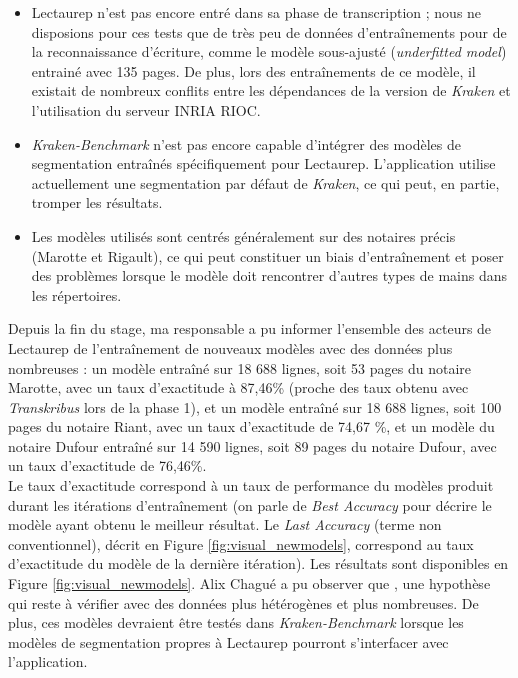 \begin{itemize}
    \item Lectaurep n'est pas encore entré dans sa phase de transcription ; nous ne disposions pour ces tests que de très peu de données d'entraînements pour de la reconnaissance d'écriture, comme le modèle sous-ajusté (\textit{underfitted model})  entrainé avec 135 pages. De plus, lors des entraînements de ce modèle, il existait de nombreux conflits entre les dépendances de la version de \textit{Kraken} et l'utilisation du serveur INRIA RIOC.
    \item \textit{Kraken-Benchmark} n'est pas encore capable d'intégrer des modèles de segmentation entraînés spécifiquement pour Lectaurep. L'application utilise actuellement une segmentation par défaut de \textit{Kraken}, ce qui peut, en partie, tromper les résultats.
    \item Les modèles utilisés sont centrés généralement sur des notaires précis (Marotte et Rigault), ce qui peut constituer un biais d'entraînement et poser des problèmes lorsque le modèle doit rencontrer d'autres types de mains dans les répertoires.
\end{itemize}

Depuis la fin du stage, ma responsable a pu informer l'ensemble des acteurs de Lectaurep de l'entraînement de nouveaux modèles  avec des données plus nombreuses : un modèle entraîné sur 18 688 lignes, soit 53 pages du notaire Marotte, avec un taux d'exactitude à 87,46\% (proche des taux obtenu avec \textit{Transkribus} lors de la phase 1), et un modèle entraîné sur 18 688 lignes, soit 100 pages du notaire Riant, avec un taux d'exactitude de 74,67 \%, et un modèle du notaire Dufour entraîné sur 14 590 lignes, soit 89 pages du notaire Dufour, avec un taux d'exactitude de 76,46\%.\\ 

Le taux d'exactitude correspond à un taux de performance du modèles produit durant les itérations d'entraînement (on parle de \textit{Best Accuracy} pour décrire le modèle ayant obtenu le meilleur résultat. Le \textit{Last Accuracy} (terme non conventionnel), décrit en Figure \ref{fig:visual_newmodels}, correspond au taux d'exactitude du modèle de la dernière itération). Les résultats sont disponibles en Figure \ref{fig:visual_newmodels}. Alix Chagué a pu observer que , une hypothèse qui reste à vérifier avec des données plus hétérogènes et plus nombreuses. De plus, ces modèles devraient être testés dans \textit{Kraken-Benchmark} lorsque les modèles de segmentation propres à Lectaurep pourront s'interfacer avec l'application.\\

